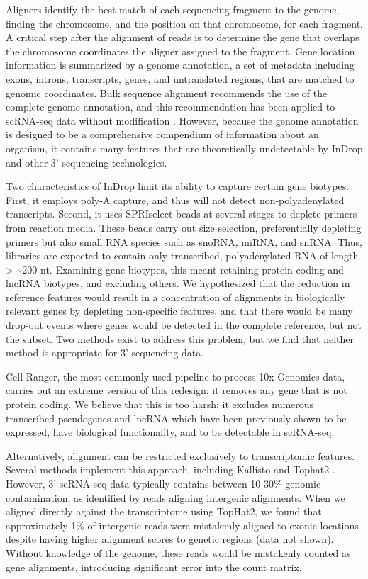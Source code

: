 Aligners identify the best match of each sequencing fragment to the genome, finding the chromosome, and the position on that chromosome, for each fragment. 
A critical step after the alignment of reads is to determine the gene that overlaps the chromosome coordinates the aligner assigned to the fragment. 
Gene location information is summarized by a genome annotation, a set of metadata including exons, introns, transcripts, genes, and untranslated regions, that are matched to genomic coordinates. 
Bulk sequence alignment recommends the use of the complete genome annotation, and this recommendation has been applied to scRNA-seq data without modification \citep{Shalek2014,Jaitin2014,Klein2015,Macosko2015}. 
However, because the genome annotation is designed to be a comprehensive compendium of information about an organism, it contains many features that are theoretically undetectable by InDrop and other 3' sequencing technologies.

Two characteristics of InDrop limit its ability to capture certain gene biotypes. 
First, it employs poly-A capture, and thus will not detect non-polyadenylated transcripts. Second, it uses SPRIselect beads at several stages to deplete primers from reaction media. 
These beads carry out size selection, preferentially depleting primers but also small RNA species such as snoRNA, miRNA, and snRNA\@. Thus, libraries are expected to contain only transcribed, polyadenylated RNA of length \textgreater{} \textasciitilde{}200 nt. 
Examining gene biotypes, this meant retaining protein coding and lncRNA biotypes, and excluding others.
We hypothesized that the reduction in reference features would result in a concentration of alignments in biologically relevant genes by depleting non-specific features, and that there would be many drop-out events where genes would be detected in the complete reference, but not the subset.
Two methods exist to address this problem, but we find that neither method is appropriate for 3' sequencing data. 

Cell Ranger, the most commonly used pipeline to process 10x Genomics data, carries out an extreme version of this redesign: it removes any gene that is not protein coding. 
We believe that this is too harsh: it excludes numerous transcribed pseudogenes and lncRNA which have been previously shown to be expressed, have biological functionality, and to be detectable in scRNA-seq.

Alternatively, alignment can be restricted exclusively to transcriptomic features. 
Several methods implement this approach, including Kallisto \citep{Bray2016} and Tophat2 \citep{Kim2013}. 
However, 3' scRNA-seq data typically contains between 10-30\% genomic contamination, as identified by reads aligning intergenic alignments. 
When we aligned directly against the transcriptome using TopHat2, we found that approximately 1\% of intergenic reads were mistakenly aligned to exonic locations despite having higher alignment scores to genetic regions (data not shown). 
Without knowledge of the genome, these reads would be mistakenly counted as gene alignments, introducing significant error into the count matrix. 

